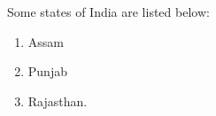 \documentclass[11pt,a4paper]{article}
\begin{document}
Some states of India are listed below:
    \begin{enumerate}
        \item Assam
        \item Punjab
        \item Rajasthan.
    \end{enumerate}
\end{document}
